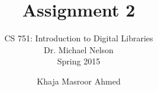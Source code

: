 \documentclass[envcountsame,envcountchap]{svmono}
\begin{document}
\author{Khaja Masroor Ahmed}
\title{Assignment 2}

\subtitle{CS 751:  Introduction to Digital Libraries\\Dr. Michael Nelson\\Spring 2015}

\maketitle

\frontmatter

\tableofcontents

\mainmatter



\backmatter



\nocite{*}
\end{document}
